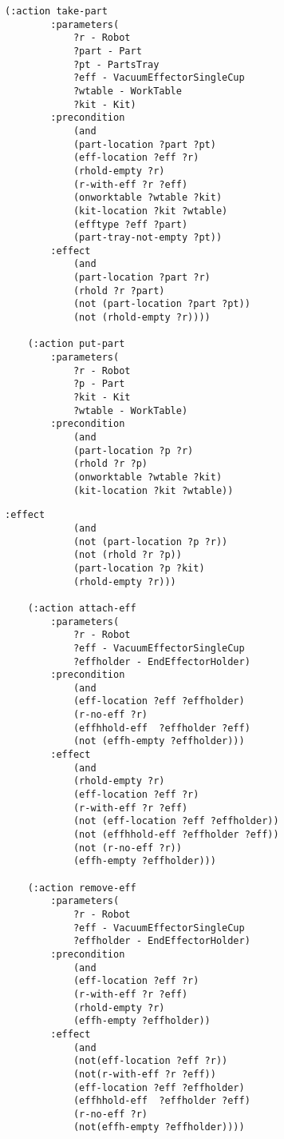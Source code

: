 \begin{appendices}
\begin{minipage}{.5\paperwidth}
\begin{mylisting}
\begin{Verbatim}[commandchars=\\\{\},commandchars=+\[\],fontsize=\small,numbersep=3pt]
	(:action take-part
		:parameters(
			?r - Robot
			?part - Part
			?pt - PartsTray
			?eff - VacuumEffectorSingleCup
			?wtable - WorkTable
			?kit - Kit)
		:precondition
			(and
			(part-location ?part ?pt)
			(eff-location ?eff ?r)
			(rhold-empty ?r)
			(r-with-eff ?r ?eff)
			(onworktable ?wtable ?kit)
			(kit-location ?kit ?wtable)
			(efftype ?eff ?part)
			(part-tray-not-empty ?pt))
		:effect
			(and
			(part-location ?part ?r)
			(rhold ?r ?part)
			(not (part-location ?part ?pt))
			(not (rhold-empty ?r))))
			
	(:action put-part
		:parameters(
			?r - Robot
			?p - Part
			?kit - Kit
			?wtable - WorkTable)
		:precondition
			(and
			(part-location ?p ?r)
			(rhold ?r ?p)
			(onworktable ?wtable ?kit)
			(kit-location ?kit ?wtable))
\end{Verbatim}
\end{mylisting}
\end{minipage}

\begin{minipage}{.5\paperwidth}
\begin{mylisting}
\begin{Verbatim}[commandchars=\\\{\},commandchars=+\[\],fontsize=\small,numbersep=3pt]
		:effect
			(and
			(not (part-location ?p ?r))
			(not (rhold ?r ?p))
			(part-location ?p ?kit)
			(rhold-empty ?r)))
			
	(:action attach-eff
		:parameters(
			?r - Robot
			?eff - VacuumEffectorSingleCup
			?effholder - EndEffectorHolder)
		:precondition
			(and
			(eff-location ?eff ?effholder) 		
			(r-no-eff ?r)				
			(effhhold-eff  ?effholder ?eff)		
			(not (effh-empty ?effholder)))		
		:effect
			(and
			(rhold-empty ?r)		
			(eff-location ?eff ?r) 		
			(r-with-eff ?r ?eff)			
			(not (eff-location ?eff ?effholder)) 	
			(not (effhhold-eff ?effholder ?eff)) 	
			(not (r-no-eff ?r))		
			(effh-empty ?effholder)))
	
	(:action remove-eff
		:parameters(
			?r - Robot
			?eff - VacuumEffectorSingleCup
			?effholder - EndEffectorHolder)
		:precondition
			(and
			(eff-location ?eff ?r)
			(r-with-eff ?r ?eff)
			(rhold-empty ?r)
			(effh-empty ?effholder))
		:effect
			(and
			(not(eff-location ?eff ?r))
			(not(r-with-eff ?r ?eff))
			(eff-location ?eff ?effholder)
			(effhhold-eff  ?effholder ?eff)
			(r-no-eff ?r)
			(not(effh-empty ?effholder))))

\end{Verbatim}
\end{mylisting}
\end{minipage}


\end{appendices}
